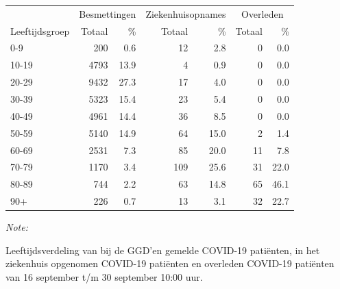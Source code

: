 \documentclass[
  english,
  man,floatsintext]{apa6}
\begin{document}
\begin{table}[H]
\centering\begingroup\fontsize{11}{13}\selectfont

\begin{threeparttable}
\begin{tabular}{lrrrrrr}
\toprule
\multicolumn{1}{c}{ } & \multicolumn{2}{c}{Besmettingen} & \multicolumn{2}{c}{Ziekenhuisopnames} & \multicolumn{2}{c}{Overleden} \\
\cmidrule(l{3pt}r{3pt}){2-3} \cmidrule(l{3pt}r{3pt}){4-5} \cmidrule(l{3pt}r{3pt}){6-7}
Leeftijdsgroep & Totaal & \% & Totaal & \% & Totaal & \%\\
\midrule
0-9 & 200 & 0.6 & 12 & 2.8 & 0 & 0.0\\
10-19 & 4793 & 13.9 & 4 & 0.9 & 0 & 0.0\\
20-29 & 9432 & 27.3 & 17 & 4.0 & 0 & 0.0\\
30-39 & 5323 & 15.4 & 23 & 5.4 & 0 & 0.0\\
40-49 & 4961 & 14.4 & 36 & 8.5 & 0 & 0.0\\
50-59 & 5140 & 14.9 & 64 & 15.0 & 2 & 1.4\\
60-69 & 2531 & 7.3 & 85 & 20.0 & 11 & 7.8\\
70-79 & 1170 & 3.4 & 109 & 25.6 & 31 & 22.0\\
80-89 & 744 & 2.2 & 63 & 14.8 & 65 & 46.1\\
90+ & 226 & 0.7 & 13 & 3.1 & 32 & 22.7\\
\bottomrule
\end{tabular}
\begin{tablenotes}
\item \textit{Note: } 
\item Leeftijdsverdeling van bij de GGD’en gemelde COVID-19 patiënten, in het ziekenhuis opgenomen COVID-19 patiënten en overleden COVID-19 patiënten van 16 september t/m 30 september 10:00 uur.
\end{tablenotes}
\end{threeparttable}
\endgroup{}
\end{table}
\end{document}
